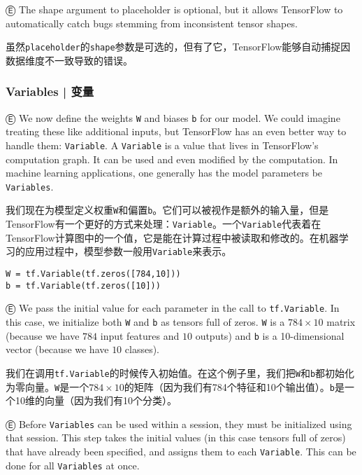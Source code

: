 Ⓔ \textcolor{etc}{The shape argument to placeholder is optional, but it allows TensorFlow to automatically catch bugs stemming from inconsistent tensor shapes.}

虽然\lstinline{placeholder}的\lstinline{shape}参数是可选的，但有了它，TensorFlow能够自动捕捉因数据维度不一致导致的错误。



\subsubsection{Variables  |  变量}

Ⓔ \textcolor{etc}{We now define the weights \lstinline{W} and biases \lstinline{b} for our model. We could imagine treating these like additional inputs, but TensorFlow has an even better way to handle them: \lstinline{Variable}. A \lstinline{Variable} is a value that lives in TensorFlow's computation graph. It can be used and even modified by the computation. In machine learning applications, one generally has the model parameters be \lstinline{Variables}.}

我们现在为模型定义权重\lstinline{W}和偏置\lstinline{b}。它们可以被视作是额外的输入量，但是TensorFlow有一个更好的方式来处理：\lstinline{Variable}。一个\lstinline{Variable}代表着在TensorFlow计算图中的一个值，它是能在计算过程中被读取和修改的。在机器学习的应用过程中，模型参数一般用\lstinline{Variable}来表示。

\begin{lstlisting}
W = tf.Variable(tf.zeros([784,10]))
b = tf.Variable(tf.zeros([10]))
\end{lstlisting}

Ⓔ \textcolor{etc}{We pass the initial value for each parameter in the call to \lstinline{tf.Variable}. In this case, we initialize both \lstinline{W} and \lstinline{b} as tensors full of zeros. \lstinline{W} is a $784\times10$ matrix (because we have $784$ input features and $10$ outputs) and \lstinline{b} is a 10-dimensional vector (because we have $10$ classes).}

我们在调用\lstinline{tf.Variable}的时候传入初始值。在这个例子里，我们把\lstinline{W}和\lstinline{b}都初始化为零向量。\lstinline{W}是一个$784\times10$的矩阵（因为我们有784个特征和10个输出值）。\lstinline{b}是一个10维的向量（因为我们有10个分类）。

Ⓔ \textcolor{etc}{Before \lstinline{Variables} can be used within a session, they must be initialized using that session. This step takes the initial values (in this case tensors full of zeros) that have already been specified, and assigns them to each \lstinline{Variable}. This can be done for all \lstinline{Variables} at once.}

